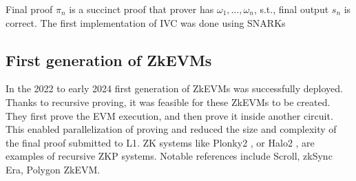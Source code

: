 Final proof $\pi_n$ is a succinct proof that prover has $\omega_1, \ldots, \omega_n$,
s.t., final output $s_n$ is correct. The first implementation of IVC was done
using SNARKs \cite{RecursiveSNARKsIVC}

\subsection{First generation of ZkEVMs}

In the 2022 to early 2024 first generation of ZkEVMs was successfully deployed.
Thanks to recursive proving, it was feasible for these ZkEVMs to be created.
They first prove the EVM execution, and then prove it inside another circuit.
This enabled parallelization of proving and reduced the size and complexity of
the final proof submitted to L1. ZK systems like Plonky2 \cite{Plonky2}, or
Halo2 \cite{Halo2}, are examples of recursive ZKP systems. Notable references
include Scroll, zkSync Era, Polygon ZkEVM.

